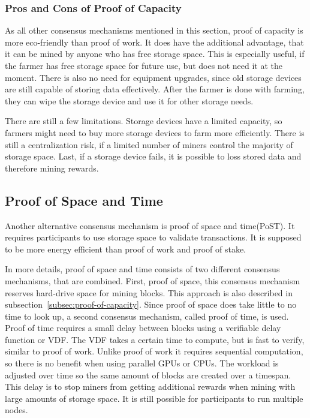 \subsubsection{Pros and Cons of Proof of Capacity}
As all other consensus mechanisms mentioned in this section, proof of capacity is more eco-friendly than proof of work.
It does have the additional advantage, that it can be mined by anyone who has free storage space.
This is especially useful, if the farmer has free storage space for future use, but does not need it at the moment.
There is also no need for equipment upgrades, since old storage devices are still capable of storing data effectively.
After the farmer is done with farming, they can wipe the storage device and use it for other storage needs.

There are still a few limitations.
Storage devices have a limited capacity, so farmers might need to buy more storage devices to farm more efficiently.
There is still a centralization risk, if a limited number of miners control the majority of storage space.
Last, if a storage device fails, it is possible to loss stored data and therefore mining rewards.\cite{geeksforgeeks-poc}


\subsection{Proof of Space and Time}\label{subsec:proof-of-space-and-time}
Another alternative consensus mechanism is proof of space and time(PoST).
It requires participants to use storage space to validate transactions.
It is supposed to be more energy efficient than proof of work and proof of stake.

In more details, proof of space and time consists of two different consensus mechanisms, that are combined.
First, proof of space, this consensus mechanism reserves hard-drive space for mining blocks.
This approach is also described in subsection\ \ref{subsec:proof-of-capacity}.
Since proof of space does take little to no time to look up, a second consensus mechanism, called proof of time, is used.
Proof of time requires a small delay between blocks using a verifiable delay function or VDF\@.
The VDF takes a certain time to compute, but is fast to verify, similar to proof of work.
Unlike proof of work it requires sequential computation, so there is no benefit when using parallel GPUs or CPUs.
The workload is adjusted over time so the same amount of blocks are created over a timespan.
This delay is to stop miners from getting additional rewards when mining with large amounts of storage space.
It is still possible for participants to run multiple nodes.\cite{supraoracles-post,chia-whitepaper}

